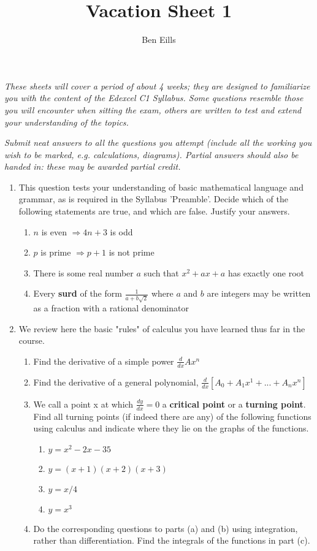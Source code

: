 \documentclass{article}
\begin{document}
\title{Vacation Sheet 1}
\author{Ben Eills}
\maketitle
\textit{These sheets will cover a period of about 4 weeks; they are designed to familiarize you with the content of the Edexcel C1 Syllabus.  Some questions resemble those you will encounter when sitting the exam, others are written to test and extend your understanding of the topics.}


\textit{Submit neat answers to all the questions you attempt (include all the working you wish to be marked, e.g. calculations, diagrams).  Partial answers should also be handed in: these may be awarded partial credit.}

\begin{enumerate}
	\item This question tests your understanding of basic mathematical language and grammar, as is required in the Syllabus 'Preamble'.  Decide which of the following statements are true, and which are false.  Justify your answers.
		\begin{enumerate}
			\item $n$ is even $\Rightarrow 4n + 3$ is odd
			\item $p$ is prime $\Rightarrow p+1 $ is not prime
			\item There is some real number $a$ such that $x^2 + ax + a$ has exactly one root
			\item Every \textbf{surd} of the form $\frac{1}{a + b\surd 2}$ where $a$ and $b$ are integers may be written as a fraction with a rational denominator
		\end{enumerate}
	
	\item We review here the basic "rules" of calculus you have learned thus far in the course.
		\begin{enumerate}
			\item Find the derivative of a simple power $\frac{d}{dx} Ax^n$
			\item Find the derivative of a general polynomial, $\frac{d}{dx}[ A_0 + A_1 x^1 + ... + A_n x^n]$
			\item We call a point x at which $\frac{dy}{dx} = 0$ a \textbf{critical point} or a \textbf{turning point}.  Find all turning points (if indeed there are any) of the following functions using calculus and indicate where they lie on the graphs of the functions.
			\begin{enumerate}
				\item $y = x^2 - 2x - 35$
				\item $y = (x+1)(x+2)(x+3)$
				\item $y = x/4$
				\item $y = x^3$
			\end{enumerate}
		\item Do the corresponding questions to parts (a) and (b) using integration, rather than differentiation.  Find the integrals of the functions in part (c).
		\end{enumerate}
	

\end{enumerate}
\end{document}
